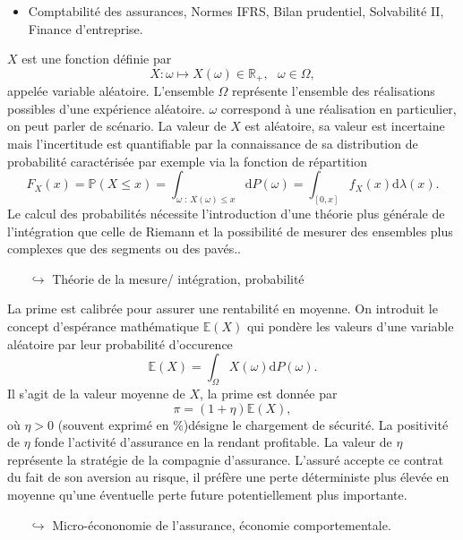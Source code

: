 \documentclass[8pt,notheorems]{beamer}
\theoremstyle{definition}
\theoremstyle{example}
\theoremstyle{mystyle}
\theoremstyle{plain}
\begin{document}
\begin{frame}[allowframebreaks]
\begin{table}[h!]
\label{tab:itamtplcostAbstract}
\end{table}
\begin{itemize}
\item Comptabilité des assurances, Normes IFRS, Bilan prudentiel, Solvabilité II, Finance d'entreprise.
\end{itemize}
$X$ est une fonction définie par
$$
X:\omega\mapsto X(\omega)\in\mathbb{R}_+,\text{ }\omega\in\Omega,
$$
appelée variable aléatoire. L'ensemble $\Omega$ représente l'ensemble des réalisations possibles d'une expérience aléatoire. $\omega$ correspond à une réalisation en particulier, on peut parler de scénario. La valeur de $X$ est aléatoire, sa valeur est incertaine mais l'incertitude est quantifiable par la connaissance de sa distribution de probabilité caractérisée par exemple via la fonction de répartition
$$
F_X(x) = \mathbb{P}(X\leq x)=\int_{\omega\text{ : }X(\omega)\leq x}\text{d}P(\omega)=\int_{[0,x]}f_X(x)\text{d}\lambda(x).
$$
Le calcul des probabilités nécessite l'introduction d'une théorie plus générale de l'intégration que celle de Riemann et la possibilité de mesurer des ensembles plus complexes que des segments ou des pavés..
\begin{itemize}
\item[$\hookrightarrow$] Théorie de la mesure/ intégration, probabilité
\end{itemize}
\end{frame}
\begin{frame}[allowframebreaks]
La prime est calibrée pour assurer une rentabilité en moyenne. On introduit le concept d'espérance mathématique $\mathbb{E}(X)$ qui pondère les valeurs d'une variable aléatoire par leur probabilité d'occurence
$$
 \mathbb{E}(X) = \int_\Omega X(\omega)\text{d}P(\omega).
$$
Il s'agit de la valeur moyenne de $X$, la prime est donnée par
$$
\pi = (1+\eta)\mathbb{E}(X),
$$
où $\eta >0$ (souvent exprimé en $\%$)désigne le chargement de sécurité. La positivité de $\eta$ fonde l'activité d'assurance en la rendant profitable. La valeur de $\eta$ représente la stratégie de la compagnie d'assurance. L'assuré accepte ce contrat du fait de son aversion au risque, il préfère une perte déterministe plus élevée en moyenne qu'une éventuelle perte future potentiellement plus importante.
\begin{itemize}
\item[$\hookrightarrow$] Micro-écononomie de l'assurance, économie comportementale. 
\end{itemize} 
\end{frame}
\end{document}
